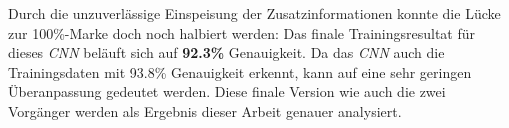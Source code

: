 Durch die unzuverlässige Einspeisung der Zusatzinformationen konnte die Lücke zur 100\%-Marke doch noch halbiert werden: Das finale Trainingsresultat für dieses \textit{CNN} beläuft sich auf \textbf{92.3\%} Genauigkeit. Da das \textit{CNN} auch die Trainingsdaten mit 93.8\% Genauigkeit erkennt, kann auf eine sehr geringen Überanpassung gedeutet werden. Diese finale Version wie auch die zwei Vorgänger werden als Ergebnis dieser Arbeit genauer analysiert.





